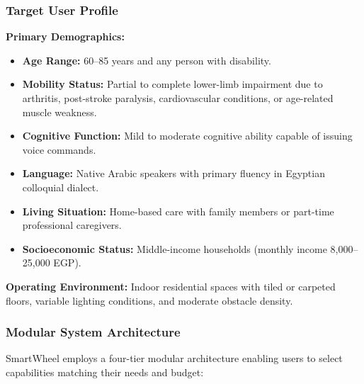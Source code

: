 \documentclass[12pt,a4paper]{report}
\begin{document}
\subsubsection{Target User Profile}

\textbf{Primary Demographics:}
\begin{itemize}[leftmargin=*,itemsep=5pt]
    \item \textbf{Age Range:} 60--85 years and any person with disability.
    \item \textbf{Mobility Status:} Partial to complete lower-limb impairment due to arthritis, post-stroke paralysis, cardiovascular conditions, or age-related muscle weakness.
    \item \textbf{Cognitive Function:} Mild to moderate cognitive ability capable of issuing voice commands.
    \item \textbf{Language:} Native Arabic speakers with primary fluency in Egyptian colloquial dialect.
    \item \textbf{Living Situation:} Home-based care with family members or part-time professional caregivers.
    \item \textbf{Socioeconomic Status:} Middle-income households (monthly income 8,000--25,000 EGP).
\end{itemize}

\textbf{Operating Environment:} Indoor residential spaces with tiled or carpeted floors, variable lighting conditions, and moderate obstacle density.

\subsubsection{Modular System Architecture}

SmartWheel employs a four-tier modular architecture enabling users to select capabilities matching their needs and budget:
\end{document}
